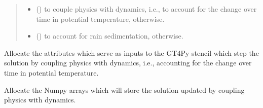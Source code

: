 \documentclass[letterpaper,10pt,english]{sphinxmanual}
\begin{document}
\begin{fulllineitems}
\begin{fulllineitems}
\begin{quote}
\begin{description}
\begin{itemize}
\item {} 
 () \textendash{}  to couple physics with dynamics, i.e., to account for the change over time in potential temperature,
 otherwise.

\item {} 
 () \textendash{}  to account for rain sedimentation,  otherwise.

\end{itemize}

\end{description}\end{quote}

\end{fulllineitems}


\begin{fulllineitems}
\label{\detokenize{api:dycore.prognostic_isentropic_nonconservative.PrognosticIsentropicNonconservative._stencil_stepping_by_coupling_physics_with_dynamics_allocate_inputs}}
Allocate the attributes which serve as inputs to the GT4Py stencil which step the solution
by coupling physics with dynamics, i.e., accounting for the change over time in potential temperature.

\end{fulllineitems}


\begin{fulllineitems}
\label{\detokenize{api:dycore.prognostic_isentropic_nonconservative.PrognosticIsentropicNonconservative._stencil_stepping_by_coupling_physics_with_dynamics_allocate_outputs}}
Allocate the Numpy arrays which will store the solution updated by coupling physics with dynamics.


\end{fulllineitems}
\end{fulllineitems}
\end{document}
